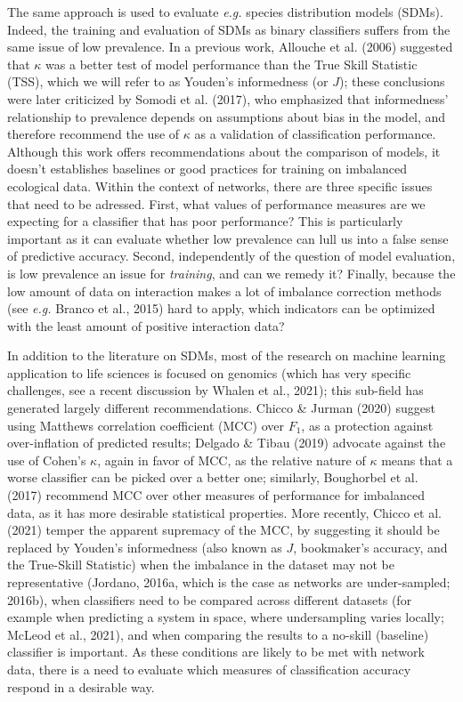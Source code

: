 \documentclass[11pt]{article}
\begin{document}
The same approach is used to evaluate \emph{e.g.} species distribution
models (SDMs). Indeed, the training and evaluation of SDMs as binary
classifiers suffers from the same issue of low prevalence. In a previous
work, Allouche et al. (2006) suggested that \(\kappa\) was a better test
of model performance than the True Skill Statistic (TSS), which we will
refer to as Youden's informedness (or \(J\)); these conclusions were
later criticized by Somodi et al. (2017), who emphasized that
informedness' relationship to prevalence depends on assumptions about
bias in the model, and therefore recommend the use of \(\kappa\) as a
validation of classification performance. Although this work offers
recommendations about the comparison of models, it doesn't establishes
baselines or good practices for training on imbalanced ecological data.
Within the context of networks, there are three specific issues that
need to be adressed. First, what values of performance measures are we
expecting for a classifier that has poor performance? This is
particularly important as it can evaluate whether low prevalence can
lull us into a false sense of predictive accuracy. Second, independently
of the question of model evaluation, is low prevalence an issue for
\emph{training}, and can we remedy it? Finally, because the low amount
of data on interaction makes a lot of imbalance correction methods (see
\emph{e.g.} Branco et al., 2015) hard to apply, which indicators can be
optimized with the least amount of positive interaction data?

In addition to the literature on SDMs, most of the research on machine
learning application to life sciences is focused on genomics (which has
very specific challenges, see a recent discussion by Whalen et al.,
2021); this sub-field has generated largely different recommendations.
Chicco \& Jurman (2020) suggest using Matthews correlation coefficient
(MCC) over \(F_1\), as a protection against over-inflation of predicted
results; Delgado \& Tibau (2019) advocate against the use of Cohen's
\(\kappa\), again in favor of MCC, as the relative nature of \(\kappa\)
means that a worse classifier can be picked over a better one;
similarly, Boughorbel et al. (2017) recommend MCC over other measures of
performance for imbalanced data, as it has more desirable statistical
properties. More recently, Chicco et al. (2021) temper the apparent
supremacy of the MCC, by suggesting it should be replaced by Youden's
informedness (also known as \(J\), bookmaker's accuracy, and the
True-Skill Statistic) when the imbalance in the dataset may not be
representative (Jordano, 2016a, which is the case as networks are
under-sampled; 2016b), when classifiers need to be compared across
different datasets (for example when predicting a system in space, where
undersampling varies locally; McLeod et al., 2021), and when comparing
the results to a no-skill (baseline) classifier is important. As these
conditions are likely to be met with network data, there is a need to
evaluate which measures of classification accuracy respond in a
desirable way.
\end{document}
